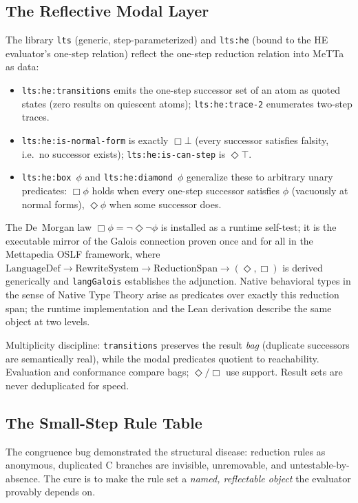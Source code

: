 \documentclass[11pt]{article}
\newcommand{\code}[1]{\texttt{#1}}
\newcommand{\HE}{\textup{HE}}
\begin{document}
\subsection{The Reflective Modal Layer}
\label{sec:modal}

The library \code{lts} (generic, step-parameterized) and
\code{lts:he} (bound to the \HE{} evaluator's one-step relation) reflect the
one-step reduction relation into MeTTa as data:

\begin{itemize}
\item \code{lts:he:transitions} emits the one-step successor set
  of an atom as quoted states (zero results on quiescent atoms);
  \code{lts:he:trace-2} enumerates two-step traces.
\item \code{lts:he:is-normal-form} is exactly $\Box\bot$ (every
  successor satisfies falsity, i.e.\ no successor exists);
  \code{lts:he:is-can-step} is $\Diamond\top$.
\item \code{lts:he:box}~$\phi$ and \code{lts:he:diamond}~$\phi$
  generalize these to arbitrary unary predicates: $\Box\phi$ holds
  when every one-step successor satisfies $\phi$ (vacuously at normal
  forms), $\Diamond\phi$ when some successor does.
\end{itemize}

The De~Morgan law $\Box\phi = \lnot\Diamond\lnot\phi$ is installed as
a runtime self-test; it is the executable mirror of the Galois
connection proven once and for all in the Mettapedia OSLF framework,
where $\mathrm{LanguageDef}\to\mathrm{RewriteSystem}\to
\mathrm{ReductionSpan}\to(\Diamond,\Box)$ is derived generically and
\code{langGalois} establishes the adjunction.  Native behavioral types
in the sense of Native Type Theory arise as predicates over exactly
this reduction span; the runtime implementation and the Lean derivation
describe the same object at two levels.

Multiplicity discipline: \code{transitions} preserves the result
\emph{bag} (duplicate successors are semantically real), while the
modal predicates quotient to reachability.  Evaluation and conformance
compare bags; $\Diamond/\Box$ use support.  Result sets are never
deduplicated for speed.

\subsection{The Small-Step Rule Table}
\label{sec:langdefpack}

The congruence bug demonstrated the structural disease: reduction
rules as anonymous, duplicated C branches are invisible, unremovable,
and untestable-by-absence.  The cure is to make the rule set a
\emph{named, reflectable object} the evaluator provably depends on.
\end{document}
